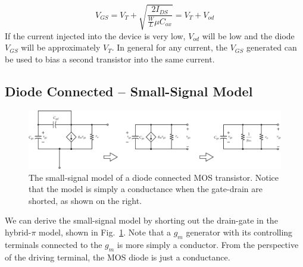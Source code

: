     \begin{equation}
        V_{GS} = V_T + \sqrt{\frac{2 I_{DS}}{\frac{W}{L} \mu C_{ox}}} = V_T + V_{od}
    \end{equation}
If the current injected into the device is very low, $V_{od}$ will be low and the diode $V_{GS}$ will be approximately $V_T$.  In general for any current, the $V_{GS}$ generated can be used to bias a second transistor into the same current. 
\subsection{Diode Connected -- Small-Signal Model}
\begin{figure}[tb]
\centering
\includegraphics[width=\columnwidth]{4mos_diode_ss.pdf}
\caption{The small-signal model of a diode connected MOS transistor.  Notice that the model is simply a conductance when the gate-drain are shorted, as shown on the right.}
\label{fig:4mos_diode_ss.pdf}
\end{figure}
We can derive the small-signal model by shorting out the drain-gate in the hybrid-$\pi$ model, shown in Fig.~\ref{fig:4mos_diode_ss.pdf}.  Note that a $g_m$ generator with its controlling terminals connected to the $g_m$ is more simply a conductor.  From the perspective of the driving terminal, the MOS diode is just a conductance.
